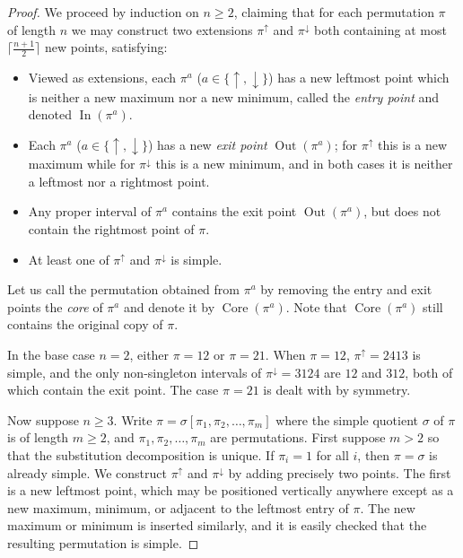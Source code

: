 \documentclass[11pt]{article}
\begin{document}
\begin{proof}
We proceed by induction on $n\geq 2$, claiming that for each permutation $\pi$ of length $n$ we may construct two extensions $\pi^{\uparrow}$ and $\pi^{\downarrow}$ both containing at most
$\lceil \frac{n+1}{2}\rceil$ new points, satisfying:
\begin{itemize}
\item Viewed as extensions, each $\pi^{a}$ ($a\in\{\uparrow,\downarrow\}$) has a new leftmost point
 which is neither a new maximum nor a new minimum, called the \emph{entry point} and denoted ${\operatorname{In}}(\pi^a)$.
\item Each $\pi^a$ ($a\in\{\uparrow,\downarrow\}$) has a new \emph{exit point} ${\operatorname{Out}}(\pi^a)$;
for $\pi^{\uparrow}$ this is a new maximum while for $\pi^{\downarrow}$ this is a new minimum, and in both cases it is neither a leftmost nor a rightmost point.
\item Any proper interval of $\pi^{a}$ contains the exit point ${\operatorname{Out}}(\pi^a)$, but does not contain the rightmost point of $\pi$.
\item At least one of $\pi^{\uparrow}$ and $\pi^{\downarrow}$ is simple.
\end{itemize}
Let us call the permutation obtained from $\pi^a$ by removing the entry and exit points the \emph{core} of $\pi^a$ and denote it by ${\operatorname{Core}}(\pi^a)$. Note that ${\operatorname{Core}}(\pi^a)$ still contains the original copy of $\pi$.

In the base case $n=2$, either $\pi=12$ or $\pi=21$. When $\pi=12$, $\pi^{\uparrow}=2413$ is simple, and the only non-singleton intervals of $\pi^{\downarrow}=3124$ are $12$ and $312$, both of which contain the exit point. The case $\pi=21$ is dealt with by symmetry.

Now suppose $n\geq 3$. Write $\pi = \sigma [\pi_1,\pi_2,\ldots,\pi_m]$ where the simple quotient $\sigma$ of $\pi$ is of length $m\geq 2$, and $\pi_1,\pi_2,\ldots, \pi_m$ are permutations. First suppose $m>2$ so that the substitution decomposition is unique. If $\pi_i = 1$ for all $i$, then $\pi = \sigma$ is already simple. We construct $\pi^{\uparrow}$ and $\pi^{\downarrow}$ by adding precisely two points. The first is a new leftmost point, which may be positioned vertically anywhere except as a new maximum, minimum, or adjacent to the leftmost entry of $\pi$. The new maximum or minimum is inserted similarly, and it is easily checked that the resulting permutation is simple.


\end{proof}
\end{document}
